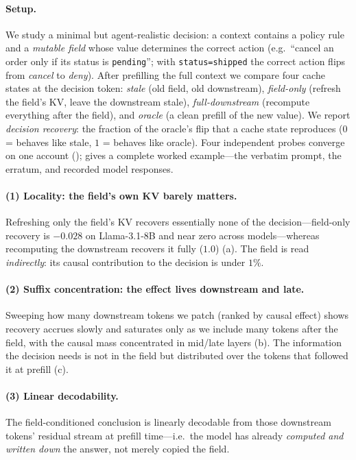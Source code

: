 \paragraph{Setup.} We study a minimal but agent-realistic decision: a context contains a policy rule and a
\emph{mutable field} whose value determines the correct action (e.g.\ ``cancel an order only if its status
is \texttt{pending}''; with \texttt{status=shipped} the correct action flips from \emph{cancel} to
\emph{deny}). After prefilling the full context we compare four cache states at the decision token:
\emph{stale} (old field, old downstream), \emph{field-only} (refresh the field's KV, leave the downstream
stale), \emph{full-downstream} (recompute everything after the field), and \emph{oracle} (a clean prefill
of the new value). We report \emph{decision recovery}: the fraction of the oracle's flip that a cache
state reproduces ($0$ = behaves like stale, $1$ = behaves like oracle). Four independent probes converge
on one account ();  gives a complete worked example---the verbatim
prompt, the erratum, and recorded model responses.


\paragraph{(1) Locality: the field's own KV barely matters.} Refreshing only the field's KV recovers
essentially none of the decision---field-only recovery is $-0.028$ on Llama-3.1-8B and near zero across
models---whereas recomputing the downstream recovers it fully ($1.0$) (a). The field is
read \emph{indirectly}: its causal contribution to the decision is under $1\%$.

\paragraph{(2) Suffix concentration: the effect lives downstream and late.} Sweeping how many downstream
tokens we patch (ranked by causal effect) shows recovery accrues slowly and saturates only as we include
many tokens after the field, with the causal mass concentrated in mid/late layers
(b). The information the decision needs is not in the field but distributed over the tokens
that followed it at prefill (c).

\paragraph{(3) Linear decodability.} The field-conditioned conclusion is linearly decodable from those
downstream tokens' residual stream at prefill time---i.e.\ the model has already \emph{computed and
written down} the answer, not merely copied the field.


